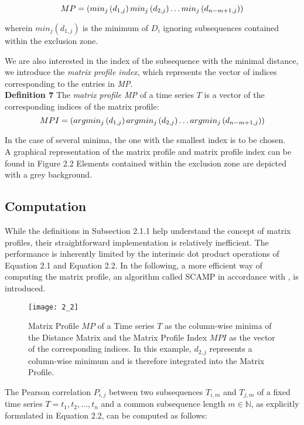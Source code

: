 \[
    MP = \left(min_j\left(d_{1,j}\right) \space min_j\left(d_{2,j}\right) \dots min_j\left(d_{n-m+1,j}\right)\right)
\]

wherein \(min_j\left(d_{1,j}\right)\) is the minimum of $D_i$ ignoring subsequences contained within the exclusion zone.

We are also interested in the index of the subsequence with the minimal distance, we introduce the \textit{matrix profile index}, which represents the vector of indices corresponding to the entries in \textit{MP}.\\

\textbf{Definition 7} The \textit{matrix profile MP} of a time series $T$ is a vector of the corresponding indices of the matrix profile:
\[
    MPI = \left(argmin_j\left(d_{1,j}\right) \space argmin_j\left(d_{2,j}\right) \dots argmin_j\left(d_{n-m+1,j}\right)\right)
\]

In the case of several minima, the one with the smallest index is to be chosen.\\

A graphical representation of the matrix profile and matrix profile index can be found in Figure 2.2 Elements contained within the exclusion zone are depicted with a grey background.\\

\subsection{Computation}

While the definitions in Subsection 2.1.1 help understand the concept of matrix profiles, their straightforward implementation is relatively inefficient. The performance is inherently limited by the interinsic dot product operations of Equation 2.1 and Equation 2.2. In the following, a more efficient way of computing the matrix profile, an algorithm called SCAMP in accordance with \cite{3}, is introduced.

\begin{figure}[h!]
    \texttt{[image: 2\_2]}
    \centering
    \caption{Matrix Profile $MP$ of a Time series $T$ as the column-wise minima of the Distance Matrix and the Matrix Profile Index $MPI$ as the vector of the corresponding indices. In this example, $d_{2,j}$ represents a column-wise minimum and is therefore integrated into the Matrix Profile.}
\end{figure}

The Pearson correlation $P_{i,j}$ between two subsequences $T_{i,m}$ and $T_{j,m}$ of a fixed time series \( T = t_1, t_2, \dots, t_n \) and a common subsequence length \( m \in \mathbb{N} \), as explicitly formulated in Equation 2.2, can be computed as follows:

